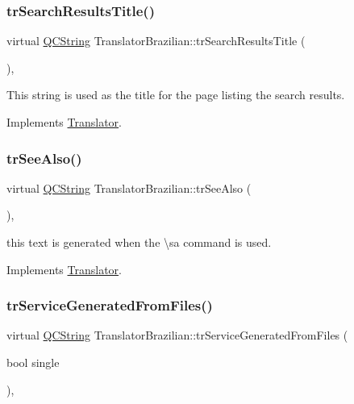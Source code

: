 \subsubsection{\texorpdfstring{trSearchResultsTitle()}{trSearchResultsTitle()}}
{\footnotesize\ttfamily virtual \mbox{\hyperlink{class_q_c_string}{Q\+C\+String}} Translator\+Brazilian\+::tr\+Search\+Results\+Title (\begin{DoxyParamCaption}{ }\end{DoxyParamCaption})\hspace{0.3cm}{\ttfamily [inline]}, {\ttfamily [virtual]}}

This string is used as the title for the page listing the search results. 

Implements \mbox{\hyperlink{class_translator}{Translator}}.

\mbox{\label{class_translator_brazilian_a0bdff00c120767b8295907911656f831}} 
\subsubsection{\texorpdfstring{trSeeAlso()}{trSeeAlso()}}
{\footnotesize\ttfamily virtual \mbox{\hyperlink{class_q_c_string}{Q\+C\+String}} Translator\+Brazilian\+::tr\+See\+Also (\begin{DoxyParamCaption}{ }\end{DoxyParamCaption})\hspace{0.3cm}{\ttfamily [inline]}, {\ttfamily [virtual]}}

this text is generated when the \textbackslash{}sa command is used. 

Implements \mbox{\hyperlink{class_translator}{Translator}}.

\mbox{\label{class_translator_brazilian_ab3a7ade1f86f8dd57b21d558a7938580}} 
\subsubsection{\texorpdfstring{trServiceGeneratedFromFiles()}{trServiceGeneratedFromFiles()}}
{\footnotesize\ttfamily virtual \mbox{\hyperlink{class_q_c_string}{Q\+C\+String}} Translator\+Brazilian\+::tr\+Service\+Generated\+From\+Files (\begin{DoxyParamCaption}\item[{bool}]{single }\end{DoxyParamCaption})\hspace{0.3cm}{\ttfamily [inline]}, {\ttfamily [virtual]}}

